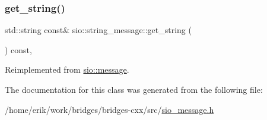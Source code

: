 \subsubsection{\texorpdfstring{get\+\_\+string()}{get\_string()}}
{\footnotesize\ttfamily std\+::string const\& sio\+::string\+\_\+message\+::get\+\_\+string (\begin{DoxyParamCaption}{ }\end{DoxyParamCaption}) const\hspace{0.3cm}{\ttfamily [inline]}, {\ttfamily [virtual]}}



Reimplemented from \hyperlink{classsio_1_1message_a8e923d7e688e1bc69b586ef33684dd7a}{sio\+::message}.



The documentation for this class was generated from the following file\+:\begin{DoxyCompactItemize}
\item 
/home/erik/work/bridges/bridges-\/cxx/src/\hyperlink{sio__message_8h}{sio\+\_\+message.\+h}\end{DoxyCompactItemize}
